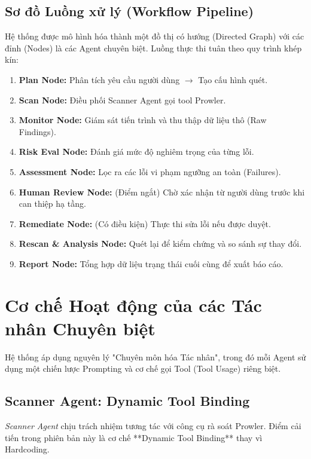 \subsection{Sơ đồ Luồng xử lý (Workflow Pipeline)}
Hệ thống được mô hình hóa thành một đồ thị có hướng (Directed Graph) với các đỉnh (Nodes) là các Agent chuyên biệt. Luồng thực thi tuân theo quy trình khép kín:

\begin{enumerate}
    \item \textbf{Plan Node:} Phân tích yêu cầu người dùng $\rightarrow$ Tạo cấu hình quét.
    \item \textbf{Scan Node:} Điều phối Scanner Agent gọi tool Prowler.
    \item \textbf{Monitor Node:} Giám sát tiến trình và thu thập dữ liệu thô (Raw Findings).
    \item \textbf{Risk Eval Node:} Đánh giá mức độ nghiêm trọng của từng lỗi.
    \item \textbf{Assessment Node:} Lọc ra các lỗi vi phạm ngưỡng an toàn (Failures).
    \item \textbf{Human Review Node:} (Điểm ngắt) Chờ xác nhận từ người dùng trước khi can thiệp hạ tầng.
    \item \textbf{Remediate Node:} (Có điều kiện) Thực thi sửa lỗi nếu được duyệt.
    \item \textbf{Rescan \& Analysis Node:} Quét lại để kiểm chứng và so sánh sự thay đổi.
    \item \textbf{Report Node:} Tổng hợp dữ liệu trạng thái cuối cùng để xuất báo cáo.
\end{enumerate}


\section{Cơ chế Hoạt động của các Tác nhân Chuyên biệt}

Hệ thống áp dụng nguyên lý "Chuyên môn hóa Tác nhân", trong đó mỗi Agent sử dụng một chiến lược Prompting và cơ chế gọi Tool (Tool Usage) riêng biệt.

\subsection{Scanner Agent: Dynamic Tool Binding}
\textit{Scanner Agent} chịu trách nhiệm tương tác với công cụ rà soát Prowler. Điểm cải tiến trong phiên bản này là cơ chế **Dynamic Tool Binding** thay vì Hardcoding.


